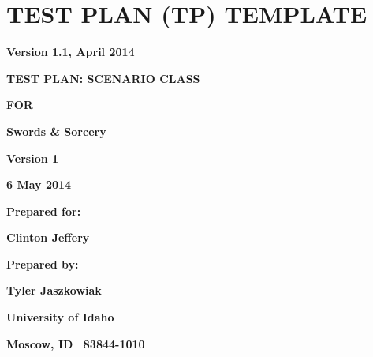 \chapter{TEST PLAN (TP) TEMPLATE}

{\centering{}\bfseries\color{black}
Version 1.1, April 2014
\par}

{\centering\bfseries\color{black}
TEST PLAN: SCENARIO CLASS}

{\centering{}\bfseries\color{black}
FOR
\par}


\bigskip

{\centering{}\bfseries\color{black}
Swords \& Sorcery
\par}


\bigskip


\bigskip


\bigskip

\bigskip


\bigskip


\bigskip


\bigskip

{\centering{}\bfseries\color{black}
Version 1
\par}

{\centering{}\bfseries\color{black}
6 May 2014
\par}


\bigskip


\bigskip

{\centering{}\bfseries\color{black}
Prepared for:
\par}

{\centering{}\bfseries\color{black}
Clinton Jeffery
\par}


\bigskip


\bigskip

{\centering{}\bfseries\color{black}
Prepared by:
\par}

{\centering{}\bfseries\color{black}
Tyler Jaszkowiak
\par}

{\centering{}\bfseries\color{black}
University of Idaho
\par}

{\centering{}\bfseries\color{black}
Moscow, ID \ 83844-1010
\par}

